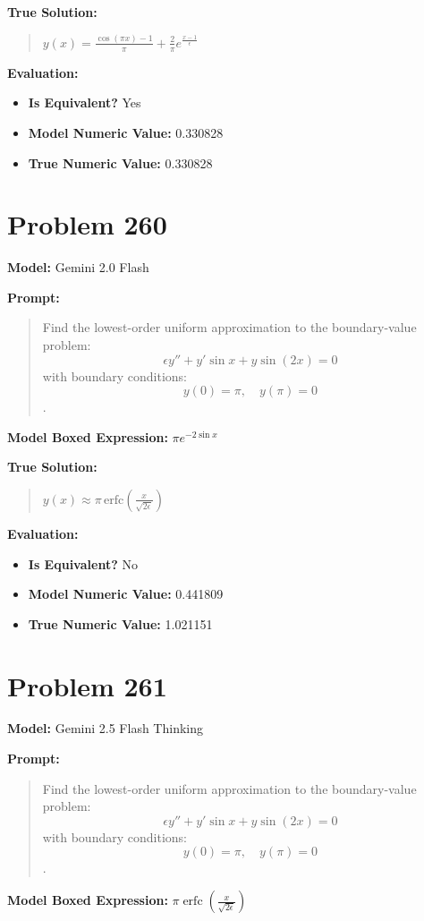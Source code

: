 \documentclass{article}
\begin{document}
{\textbf{True Solution:}
\begin{quote}
$y(x) = \frac{\cos(\pi x) - 1}{\pi} + \frac{2}{\pi}e^{\frac{x-1}{\epsilon}}$
\end{quote}

\textbf{Evaluation:}
\begin{itemize}
\item \textbf{Is Equivalent?} Yes
\item \textbf{Model Numeric Value:} 0.330828
\item \textbf{True Numeric Value:} 0.330828
\end{itemize}
\vspace{1cm}
\section*{Problem 260}
\textbf{Model:} Gemini 2.0 Flash

\textbf{Prompt:}
\begin{quote}
Find the lowest-order uniform approximation to the boundary-value problem: $$ \epsilon y'' + y' \sin x + y \sin(2x) = 0 $$ with boundary conditions:$$ y(0) = \pi, \quad y(\pi) = 0 $$.
\end{quote}
\textbf{Model Boxed Expression:} $\pi e^{-2 \sin x}$

\textbf{True Solution:}
\begin{quote}
$y(x) \approx \pi \, \text{erfc}\left(\frac{x}{\sqrt{2\epsilon}}\right)$
\end{quote}

\textbf{Evaluation:}
\begin{itemize}
\item \textbf{Is Equivalent?} No
\item \textbf{Model Numeric Value:} 0.441809
\item \textbf{True Numeric Value:} 1.021151
\end{itemize}
\vspace{1cm}
\section*{Problem 261}
\textbf{Model:} Gemini 2.5 Flash Thinking

\textbf{Prompt:}
\begin{quote}
Find the lowest-order uniform approximation to the boundary-value problem: $$ \epsilon y'' + y' \sin x + y \sin(2x) = 0 $$ with boundary conditions:$$ y(0) = \pi, \quad y(\pi) = 0 $$.
\end{quote}
\textbf{Model Boxed Expression:} $\pi \operatorname{erfc}\left(\frac{x}{\sqrt{2\epsilon}}\right)$

}
\end{document}
